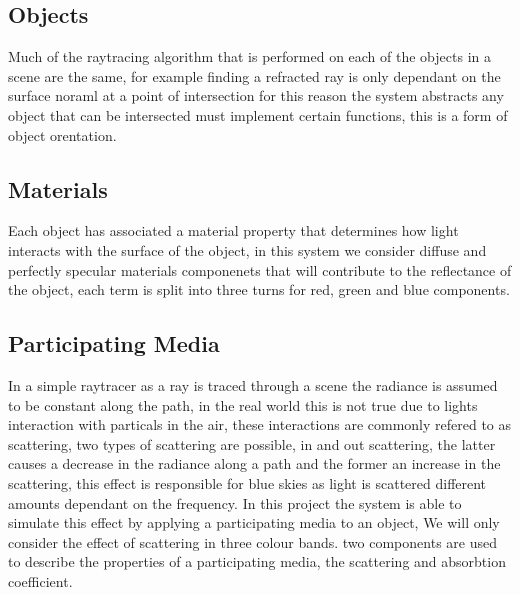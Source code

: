 \begin{figure}
\end{figure}

\subsection{Objects}
Much of the raytracing algorithm that is performed on each of the
objects in a scene are the same, for example finding a refracted
ray is only dependant on the surface noraml at a point of intersection
for this reason the system abstracts any object that can be intersected
must implement certain functions, this is a form of object orentation.

\subsection{Materials}
Each object has associated a material property that determines how light interacts with the surface of the
object, in this system we consider diffuse and perfectly specular materials componenets that will contribute
to the reflectance of the object, each term is split into three turns for red, green and blue components.

\subsection{Participating Media}
In a simple raytracer as a ray is traced through a scene the radiance is assumed to be constant along the path,
in the real world this is not true due to lights interaction with particals in the air, these interactions
are commonly refered to as scattering, two types of scattering are possible, in and out scattering, the latter
causes a decrease in the radiance along a path and the former an increase in the scattering, this effect is
responsible for blue skies as light is scattered different amounts dependant on the frequency. In this project
the system is able to simulate this effect by applying a participating media to an object, We will only consider
the effect of scattering in three colour bands. two components are used to describe the
properties of a participating media, the scattering and absorbtion coefficient. 
